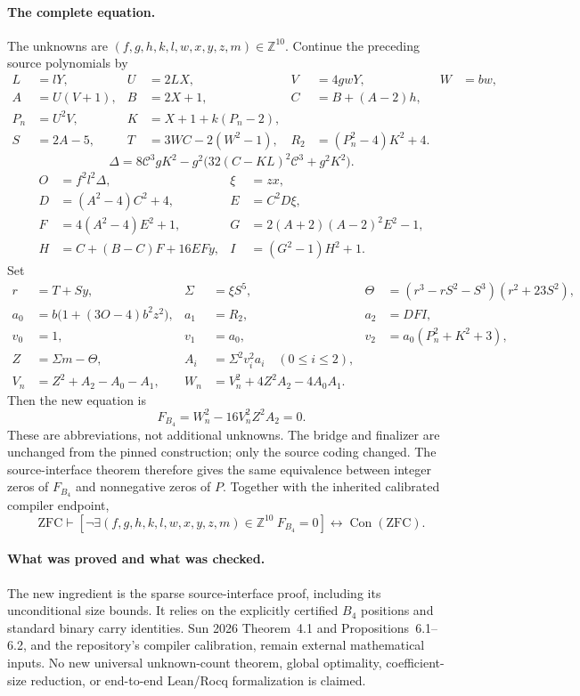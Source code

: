 \paragraph{The complete equation.}
The unknowns are $(f,g,h,k,l,w,x,y,z,m)\in\mathbb Z^{10}$.
Continue the preceding source polynomials by
\begin{align*}
 L&=lY,&U&=2LX,&V&=4gwY,&W&=bw,\\
 A&=U(V+1),&B&=2X+1,&C&=B+(A-2)h,\\
 P_n&=U^2V,&K&=X+1+k(P_n-2),\\
 S&=2A-5,&T&=3WC-2(W^2-1),&R_2&=(P_n^2-4)K^2+4.
\end{align*}
\[
 \Delta=8\mathscr C^3gK^2-g^2\bigl(32(C-KL)^2\mathscr C^3+g^2K^2\bigr).
\]
\begin{align*}
 O&=f^2l^2\Delta,&\xi&=zx,\\
 D&=(A^2-4)C^2+4,&E&=C^2D\xi,\\
 F&=4(A^2-4)E^2+1,&G&=2(A+2)(A-2)^2E^2-1,\\
 H&=C+(B-C)F+16EFy,&I&=(G^2-1)H^2+1.
\end{align*}
Set
\begin{align*}
 r&=T+Sy,&\Sigma&=\xi S^5,&
 \Theta&=(r^3-rS^2-S^3)(r^2+23S^2),\\
 a_0&=b\bigl(1+(3O-4)b^2z^2\bigr),&a_1&=R_2,&a_2&=DFI,\\
 v_0&=1,&v_1&=a_0,&v_2&=a_0(P_n^2+K^2+3),\\
 Z&=\Sigma m-\Theta,&A_i&=\Sigma^2v_i^2a_i\quad(0\le i\le2),\\
 V_n&=Z^2+A_2-A_0-A_1,&W_n&=V_n^2+4Z^2A_2-4A_0A_1.
\end{align*}
Then the new equation is
\[
 \boxed{F_{B_4}=W_n^2-16V_n^2Z^2A_2=0.}
\]
These are abbreviations, not additional unknowns. The bridge and finalizer
are unchanged from the pinned construction; only the source coding changed.
The source-interface theorem therefore gives the same equivalence between
integer zeros of $F_{B_4}$ and nonnegative zeros of $P$.
Together with the inherited calibrated compiler endpoint,
\[
 \mathrm{ZFC}\vdash
 [\neg\exists(f,g,h,k,l,w,x,y,z,m)\in\mathbb Z^{10}\ F_{B_4}=0]
 \longleftrightarrow\operatorname{Con}(\mathrm{ZFC}).
\]

\paragraph{What was proved and what was checked.}
The new ingredient is the sparse source-interface proof, including its
unconditional size bounds. It relies on the explicitly certified $B_4$
positions and standard binary carry identities. Sun 2026 Theorem~4.1 and
Propositions~6.1--6.2, and the repository's compiler calibration, remain
external mathematical inputs. No new universal unknown-count theorem,
global optimality, coefficient-size reduction, or end-to-end Lean/Rocq
formalization is claimed.

